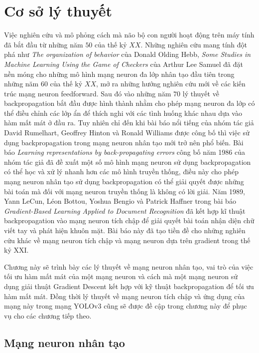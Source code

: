 \chapter{Cơ sở lý thuyết}
Việc nghiên cứu và mô phỏng cách mà não bộ con người hoạt động trên máy tính đã bắt đầu từ những năm $50$ của thế kỷ $XX$. Những nghiên cứu mang tính đột phá như \textit{The organization of behavior}\cite{Hebb:1949} của Donald Olding Hebb, \textit{Some Studies in Machine Learning Using the Game of Checkers}\cite{Arthur:1959:IBM} của Arthur Lee Samuel đã đặt nền móng cho những mô hình mạng neuron đa lớp nhân tạo đầu tiên trong những năm $60$ của thế kỷ $XX$, mở ra những hướng nghiên cứu mới về các kiến trúc mạng neuron feedforward. Sau đó vào những năm $70$ lý thuyết về backpropagation bắt đầu được hình thành nhằm cho phép mạng neuron đa lớp có thể điều chỉnh các lớp ẩn để thích nghi với các tình huống khác nhau dựa vào hàm mất mát ở đầu ra. Tuy nhiên chỉ đến khi bài báo nổi tiếng của nhóm tác giả David Rumelhart, Geoffrey Hinton và Ronald Williams được công bố thì việc sử dụng backpropagation trong mạng neuron nhân tạo mới trở nên phổ biến. Bài báo \textit{Learning representations by back-propagating errors}\cite{DavidEtAl:1986} công bố năm 1986 của nhóm tác giả đã đề xuất một số mô hình mạng neuron sử dụng backpropagation có thể học và xử lý nhanh hơn các mô hình truyền thống, điều này cho phép mạng neuron nhân tạo sử dụng backpropagation có thể giải quyết được những bài toán mà đối với mạng neuron truyền thống là không có lời giải. Năm 1989, Yann LeCun, Léon Bottou, Yoshua Bengio và Patrick Haffner trong bài báo \textit{Gradient-Based Learning Applied to Document Recognition}\cite{LeCunEtAl:1998} đã kết hợp kĩ thuật backpropagation vào mạng neuron tích chập để giải quyết bài toán nhận diện chữ viết tay và phát hiện khuôn mặt. Bài báo này đã tạo tiền đề cho những nghiên cứu khác về mạng neuron tích chập và mạng neuron dựa trên gradient trong thế kỷ XXI.

Chương này sẽ trình bày các lý thuyết về mạng neuron nhân tạo, vai trò của việc tối ưu hàm mất mát của một mạng neuron và cách mà một mạng neuron sử dụng giải thuật Gradient Descent kết hợp với kỹ thuật backpropagation để tối ưu hàm mất mát. Đồng thời lý thuyết về mạng neuron tích chập và ứng dụng của mạng này trong mạng YOLOv3 cũng sẽ được đề cập trong chương này để phục vụ cho các chương tiếp theo.

\section{Mạng neuron nhân tạo}
